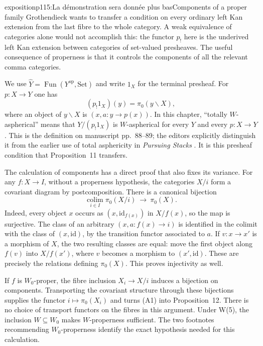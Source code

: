 \begin{dcomment}{exposition}{p115:La démonstration sera donnée plus bas}{Components of a proper family}
Grothendieck wants to transfer a condition on every ordinary left Kan extension from the last fibre to the whole category.  A weak equivalence of categories alone would not accomplish this: the functor $p_!$ here is the underived left Kan extension between categories of set-valued presheaves.  The useful consequence of properness is that it controls the components of all the relevant comma categories.

We use $\widehat Y=\operatorname{Fun}(Y^{\mathrm{op}},\mathrm{Set})$ and write $1_X$ for the terminal presheaf.  For $p:X\to Y$ one has
\[
 (p_!1_X)(y)=\pi_0(y\backslash X),
\]
where an object of $y\backslash X$ is $(x,a:y\to p(x))$.  In this chapter, ``totally $W$-aspherical'' means that $Y/(p_!1_X)$ is $W$-aspherical for every $Y$ and every $p:X\to Y$.  This is the definition on manuscript pp.~88--89; the editors explicitly distinguish it from the earlier use of total asphericity in \emph{Pursuing Stacks} \citep[Definition~1]{Grothendieck1990XII}.  It is this presheaf condition that Proposition~11 transfers.

The calculation of components has a direct proof that also fixes its variance.  For any $f:X\to I$, without a properness hypothesis, the categories $X/i$ form a covariant diagram by postcomposition.  There is a canonical bijection
\[
 \operatorname*{colim}_{i\in I}\pi_0(X/i)\ \longrightarrow\ \pi_0(X).
 \tag{A1}
\]
Indeed, every object $x$ occurs as $(x,\mathrm{id}_{f(x)})$ in $X/f(x)$, so the map is surjective.  The class of an arbitrary $(x,a:f(x)\to i)$ is identified in the colimit with the class of $(x,\mathrm{id})$, by the transition functor associated to $a$.  If $v:x\to x'$ is a morphism of $X$, the two resulting classes are equal: move the first object along $f(v)$ into $X/f(x')$, where $v$ becomes a morphism to $(x',\mathrm{id})$.  These are precisely the relations defining $\pi_0(X)$.  This proves injectivity as well.

If $f$ is $W_0$-proper, the fibre inclusion $X_i\to X/i$ induces a bijection on components.  Transporting the covariant structure through these bijections supplies the functor $i\mapsto\pi_0(X_i)$ and turns (A1) into Proposition~12.  There is no choice of transport functors on the fibres in this argument.  Under W(5), the inclusion $W\subseteq W_0$ makes $W$-properness sufficient.  The two footnotes recommending $W_0$-properness identify the exact hypothesis needed for this calculation.


\end{dcomment}
